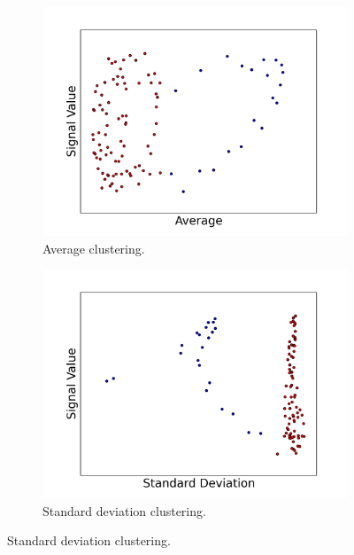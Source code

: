 \documentclass[11pt, letterpaper]{article}            %
\begin{document}
\begin{figure}[htbp]
  \centering
  \begin{subfigure}[b]{0.49\textwidth}
    \includegraphics[width=\textwidth]{./gfx/f1f5.png}
    \caption{Average clustering.\label{fig:Caverage}}
  \end{subfigure}%
  \hfill
  \begin{subfigure}[b]{0.49\textwidth}
    \includegraphics[width=\textwidth]{./gfx/f2f5.png}
    \caption{Standard deviation clustering.\label{fig:Cstandarddeviation}}
  \end{subfigure}


\end{figure}
\end{document}
